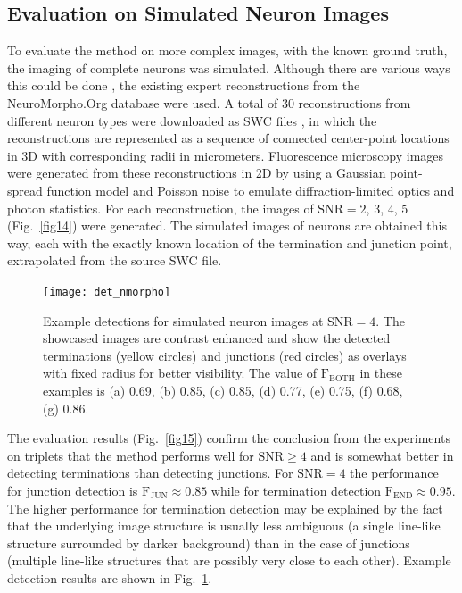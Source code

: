 \subsection{Evaluation on Simulated Neuron Images}
\label{subsec:experiments-simulated}
To evaluate the method on more complex images, with the known ground truth, the imaging of complete neurons was simulated. Although there are various ways this could be done \cite{koene2009netmorph, vasilkoski2009detection}, the existing expert reconstructions from the NeuroMorpho.Org database \cite{ascoli2007neuromorpho} were used. A total of 30 reconstructions from different neuron types were downloaded as SWC files \cite{cannon1998line}, in which the reconstructions are represented as a sequence of connected center-point locations in 3D with corresponding radii in micrometers. Fluorescence microscopy images were generated from these reconstructions in 2D by using a Gaussian point-spread function model and Poisson noise to emulate diffraction-limited optics and photon statistics. For each reconstruction, the images of $\textrm{SNR}=2$, $3$, $4$, $5$ (Fig.~\ref{fig14}) were generated. The simulated images of neurons are obtained this way, each with the exactly known location of the termination and junction point, extrapolated from the source SWC file.
\begin{figure}
	\centering
		\texttt{[image: det\_nmorpho]}
			\caption{Example detections for simulated neuron images at $\textrm{SNR}=4$. The showcased images are contrast enhanced and show the detected terminations (yellow circles) and junctions (red circles) as overlays with fixed radius for better visibility. The value of $\textrm{F}_\textrm{BOTH}$ in these examples is (a) 0.69, (b) 0.85, (c) 0.85, (d) 0.77, (e) 0.75, (f) 0.68, (g) 0.86.}
	\label{fig16}
\end{figure}
The evaluation results (Fig.~\ref{fig15}) confirm the conclusion from the experiments on triplets that the method performs well for $\textrm{SNR} \geq 4$ and is somewhat better in detecting terminations than detecting junctions. For $\textrm{SNR} = 4$ the performance for junction detection is $\textrm{F}_{\textrm{JUN}} \approx 0.85$ while for termination detection $\textrm{F}_{\textrm{END}} \approx 0.95$. The higher performance for termination detection may be explained by the fact that the underlying image structure is usually less ambiguous (a single line-like structure surrounded by darker background) than in the case of junctions (multiple line-like structures that are possibly very close to each other). Example detection results are shown in Fig.~\ref{fig16}.
